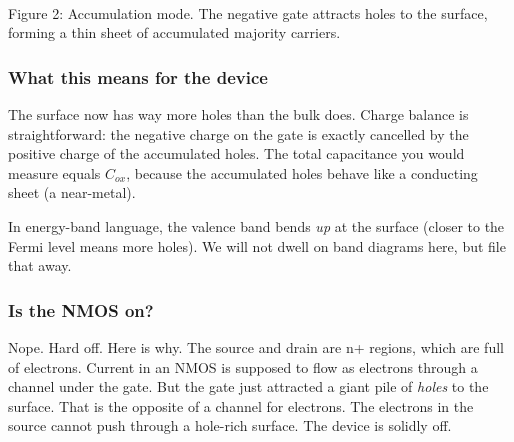 \documentclass[11pt]{article}
\begin{document}
\begin{center}
\\
{\small Figure 2: Accumulation mode. The negative gate attracts holes to the surface, forming a thin sheet of accumulated majority carriers.}
\end{center}

\subsubsection{What this means for the device}

The surface now has way more holes than the bulk does. Charge balance is straightforward: the negative charge on the gate is exactly cancelled by the positive charge of the accumulated holes. The total capacitance you would measure equals $C_{ox}$, because the accumulated holes behave like a conducting sheet (a near-metal).

In energy-band language, the valence band bends \emph{up} at the surface (closer to the Fermi level means more holes). We will not dwell on band diagrams here, but file that away.

\subsubsection{Is the NMOS on?}

Nope. Hard off. Here is why. The source and drain are n+ regions, which are full of electrons. Current in an NMOS is supposed to flow as electrons through a channel under the gate. But the gate just attracted a giant pile of \emph{holes} to the surface. That is the opposite of a channel for electrons. The electrons in the source cannot push through a hole-rich surface. The device is solidly off.
\end{document}

